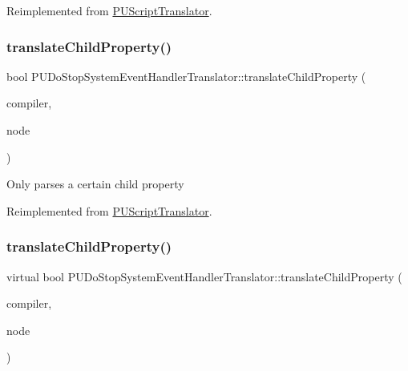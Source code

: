 Reimplemented from \hyperlink{classPUScriptTranslator_ab587d01348ae3e678cb700c719b2b113}{P\+U\+Script\+Translator}.

\mbox{\label{classPUDoStopSystemEventHandlerTranslator_aea6bb317df4b9a140d9bc520f2a8f452}} 
\subsubsection{\texorpdfstring{translate\+Child\+Property()}{translateChildProperty()}\hspace{0.1cm}{\footnotesize\ttfamily [1/2]}}
{\footnotesize\ttfamily bool P\+U\+Do\+Stop\+System\+Event\+Handler\+Translator\+::translate\+Child\+Property (\begin{DoxyParamCaption}\item[{\hyperlink{classPUScriptCompiler}{P\+U\+Script\+Compiler} $\ast$}]{compiler,  }\item[{\hyperlink{classPUAbstractNode}{P\+U\+Abstract\+Node} $\ast$}]{node }\end{DoxyParamCaption})\hspace{0.3cm}{\ttfamily [virtual]}}

Only parses a certain child property 

Reimplemented from \hyperlink{classPUScriptTranslator_a0374d83a8a04e57918975d525e0f8fe8}{P\+U\+Script\+Translator}.

\mbox{\label{classPUDoStopSystemEventHandlerTranslator_a168e94a94b9bb6607b36827a1d6274a2}} 
\subsubsection{\texorpdfstring{translate\+Child\+Property()}{translateChildProperty()}\hspace{0.1cm}{\footnotesize\ttfamily [2/2]}}
{\footnotesize\ttfamily virtual bool P\+U\+Do\+Stop\+System\+Event\+Handler\+Translator\+::translate\+Child\+Property (\begin{DoxyParamCaption}\item[{\hyperlink{classPUScriptCompiler}{P\+U\+Script\+Compiler} $\ast$}]{compiler,  }\item[{\hyperlink{classPUAbstractNode}{P\+U\+Abstract\+Node} $\ast$}]{node }\end{DoxyParamCaption})\hspace{0.3cm}{\ttfamily [virtual]}}

